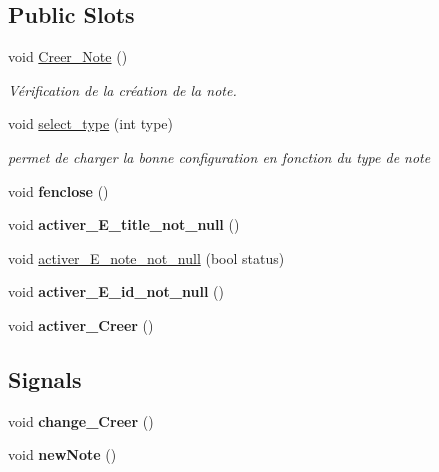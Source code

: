 \subsection*{Public Slots}
\begin{DoxyCompactItemize}
\item 
\mbox{\label{class_creation___note_a533d14d9799dfb6257de99778d38a8ba}} 
void \hyperlink{class_creation___note_a533d14d9799dfb6257de99778d38a8ba}{Creer\+\_\+\+Note} ()
\begin{DoxyCompactList}\small\item\em Vérification de la création de la note. \end{DoxyCompactList}\item 
void \hyperlink{class_creation___note_a4627e5957db87af2b7c43937857e9d6e}{select\+\_\+type} (int type)
\begin{DoxyCompactList}\small\item\em permet de charger la bonne configuration en fonction du type de note \end{DoxyCompactList}\item 
\mbox{\label{class_creation___note_a0c3fbd0f18c5145903f14c1ce137ba3d}} 
void {\bfseries fenclose} ()
\item 
\mbox{\label{class_creation___note_a222f2225fc657cec0abd511e2d00226d}} 
void {\bfseries activer\+\_\+\+E\+\_\+title\+\_\+not\+\_\+null} ()
\item 
void \hyperlink{class_creation___note_ad786b2c2e3273160009e560a8de2ab6c}{activer\+\_\+\+E\+\_\+note\+\_\+not\+\_\+null} (bool status)
\item 
\mbox{\label{class_creation___note_af7a9ff90131d51056a8e88806c9a9fbc}} 
void {\bfseries activer\+\_\+\+E\+\_\+id\+\_\+not\+\_\+null} ()
\item 
\mbox{\label{class_creation___note_a95923bfacb52c2bfc279c56be61284f4}} 
void {\bfseries activer\+\_\+\+Creer} ()
\end{DoxyCompactItemize}
\subsection*{Signals}
\begin{DoxyCompactItemize}
\item 
\mbox{\label{class_creation___note_ac077793d8161d266c9d500c6545da80e}} 
void {\bfseries change\+\_\+\+Creer} ()
\item 
\mbox{\label{class_creation___note_a2aff8e8867c9fed096afbeaa56f3dcdb}} 
void {\bfseries new\+Note} ()
\end{DoxyCompactItemize}
